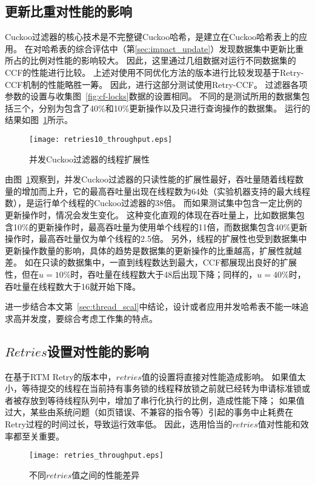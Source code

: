 \subsection{更新比重对性能的影响}
Cuckoo过滤器的核心技术是不完整键Cuckoo哈希，是建立在Cuckoo哈希表上的应用。
在对哈希表的综合评估中（第\ref{sec:impact_update}）发现数据集中更新比重所占的比例对性能的影响较大。
因此，这里通过几组数据对运行不同数据集的CCF的性能进行比较。
上述对使用不同优化方法的版本进行比较发现基于Retry-CCF机制的性能略胜一筹。
因此，进行这部分测试使用Retry-CCF。
过滤器各项参数的设置与收集图~\ref{fig:cf-locks}数据的设置相同。
不同的是测试所用的数据集包括三个，分别为包含了40\%和10\%更新操作以及只进行查询操作的数据集。
运行的结果如图~\ref{fig:retry_thp}所示。

\begin{figure}[htbp]
\centering
\texttt{[image: retries10\_throughput.eps]}
\caption{并发Cuckoo过滤器的线程扩展性}\label{fig:retry_thp}
\end{figure}

由图~\ref{fig:retry_thp}观察到，并发Cuckoo过滤器的只读性能的扩展性最好，吞吐量随着线程数量的增加而上升，它的最高吞吐量出现在线程数为64处（实验机器支持的最大线程数），是运行单个线程的Cuckoo过滤器的38倍。
而如果测试集中包含一定比例的更新操作时，情况会发生变化。
这种变化直观的体现在吞吐量上，比如数据集包含10\%的更新操作时，最高吞吐量为使用单个线程的11倍，而数据集包含40\%更新操作时，最高吞吐量仅为单个线程的2.5倍。
另外，线程的扩展性也受到数据集中更新操作数量的影响，具体的趋势是数据集的更新操作的比重越高，扩展性就越差。
如在只读的数据集中，一直到线程数达到最大，CCF都展现出良好的扩展性，但在$u = 10\%$时，吞吐量在线程数大于48后出现下降；同样的，$u = 40\%$时，吞吐量在线程数大于16就开始下降。

进一步结合本文第~\ref{sec:thread_scal}中结论，设计或者应用并发哈希表不能一味追求高并发度，要综合考虑工作集的特点。

\subsection{$Retries$设置对性能的影响}
在基于RTM Retry的版本中，$retries$值的设置将直接对性能造成影响。
如果值太小，等待提交的线程在当前持有事务锁的线程释放锁之前就已经转为申请标准锁或者被存放到等待线程队列中，增加了串行化执行的比例，造成性能下降；
如果值过大，某些由系统问题（如页错误、不兼容的指令等）引起的事务中止耗费在Retry过程的时间过长，导致运行效率低。
因此，选用恰当的$retries$值对性能和效率都至关重要。

\begin{figure}[htbp]
\centering
\texttt{[image: retries\_throughput.eps]}
\caption{不同$retries$值之间的性能差异}\label{fig:diff-retry}
\end{figure}

